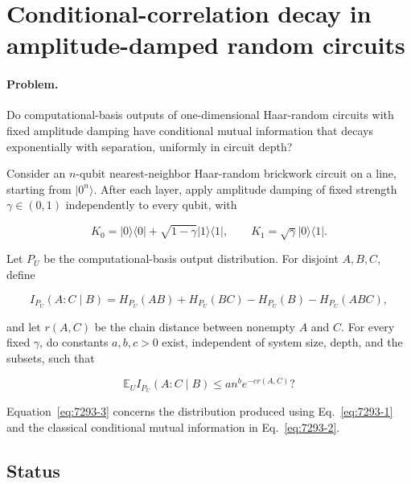 \section{Conditional-correlation decay in amplitude-damped random circuits}
\label{sec:op_72937f30974953ba}

\paragraph{Problem.}
Do computational-basis outputs of one-dimensional Haar-random circuits with fixed amplitude damping have conditional mutual information that decays exponentially with separation, uniformly in circuit depth?

Consider an $n$-qubit nearest-neighbor Haar-random brickwork circuit on a line, starting from $|0^n\rangle$. After each layer, apply amplitude damping of fixed strength $\gamma\in(0,1)$ independently to every qubit, with

\begin{equation}
K_0=|0\rangle\langle0|+\sqrt{1-\gamma}|1\rangle\langle1|,
\qquad
K_1=\sqrt\gamma|0\rangle\langle1|.
\label{eq:7293-1}
\end{equation}

Let $P_U$ be the computational-basis output distribution. For disjoint $A,B,C$, define

\begin{equation}
I_{P_U}(A:C\mid B)=H_{P_U}(AB)+H_{P_U}(BC)-H_{P_U}(B)-H_{P_U}(ABC),
\label{eq:7293-2}
\end{equation}

and let $r(A,C)$ be the chain distance between nonempty $A$ and $C$. For every fixed $\gamma$, do constants $a,b,c>0$ exist, independent of system size, depth, and the subsets, such that

\begin{equation}
\mathbb E_U I_{P_U}(A:C\mid B)\leq an^b e^{-c r(A,C)}?
\label{eq:7293-3}
\end{equation}

Equation~\eqref{eq:7293-3} concerns the distribution produced using Eq.~\eqref{eq:7293-1} and the classical conditional mutual information in Eq.~\eqref{eq:7293-2}.

\subsection*{Status}

